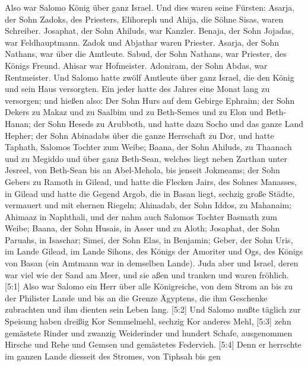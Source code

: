  Also war Salomo König über ganz Israel.  Und
dies waren seine Fürsten: Asarja, der Sohn Zadoks, des Priesters,
 Elihoreph und Ahija, die Söhne Sisas, waren Schreiber.
Josaphat, der Sohn Ahiluds, war Kanzler.  Benaja, der Sohn
Jojadas, war Feldhauptmann. Zadok und Abjathar waren Priester.
 Asarja, der Sohn Nathans, war über die Amtleute. Sabud, der
Sohn Nathans, war Priester, des Königs Freund.  Ahisar war
Hofmeister. Adoniram, der Sohn Abdas, war Rentmeister.  Und
Salomo hatte zwölf Amtleute über ganz Israel, die den König und sein
Haus versorgten. Ein jeder hatte des Jahres eine Monat lang zu
versorgen;  und hießen also: Der Sohn Hurs auf dem Gebirge
Ephraim;  der Sohn Dekers zu Makaz und zu Saalbim und zu
Beth-Semes und zu Elon und Beth-Hanan;  der Sohn Heseds zu
Arubboth, und hatte dazu Socho und das ganze Land Hepher; 
der Sohn Abinadabs über die ganze Herrschaft zu Dor, und hatte Taphath,
Salomos Tochter zum Weibe;  Baana, der Sohn Ahiluds, zu
Thaanach und zu Megiddo und über ganz Beth-Sean, welches liegt neben
Zarthan unter Jesreel, von Beth-Sean bis an Abel-Mehola, bis jenseit
Jokmeams;  der Sohn Gebers zu Ramoth in Gilead, und hatte
die Flecken Jairs, des Sohnes Manasses, in Gilead und hatte die Gegend
Argob, die in Basan liegt, sechzig große Städte, vermauert und mit
ehernen Riegeln;  Ahinadab, der Sohn Iddos, zu Mahanaim;
 Ahimaaz in Naphthali, und der nahm auch Salomos Tochter
Basmath zum Weibe;  Baana, der Sohn Husais, in Asser und zu
Aloth;  Josaphat, der Sohn Paruahs, in Isaschar;
 Simei, der Sohn Elas, in Benjamin;  Geber,
der Sohn Uris, im Lande Gilead, im Lande Sihons, des Königs der Amoriter
und Ogs, des Königs von Basan (ein Amtmann war in demselben Lande).
 Juda aber und Israel, deren war viel wie der Sand am Meer,
und sie aßen und tranken und waren fröhlich.  {[}5:1{]}
Also war Salomo ein Herr über alle Königreiche, von dem Strom an bis zu
der Philister Lande und bis an die Grenze Ägyptens, die ihm Geschenke
zubrachten und ihm dienten sein Leben lang.  {[}5:2{]} Und
Salomo mußte täglich zur Speisung haben dreißig Kor Semmelmehl, sechzig
Kor anderes Mehl,  {[}5:3{]} zehn gemästete Rinder und
zwanzig Weiderinder und hundert Schafe, ausgenommen Hirsche und Rehe und
Gemsen und gemästetes Federvieh.  {[}5:4{]} Denn er
herrschte im ganzen Lande diesseit des Stromes, von Tiphsah bis gen
